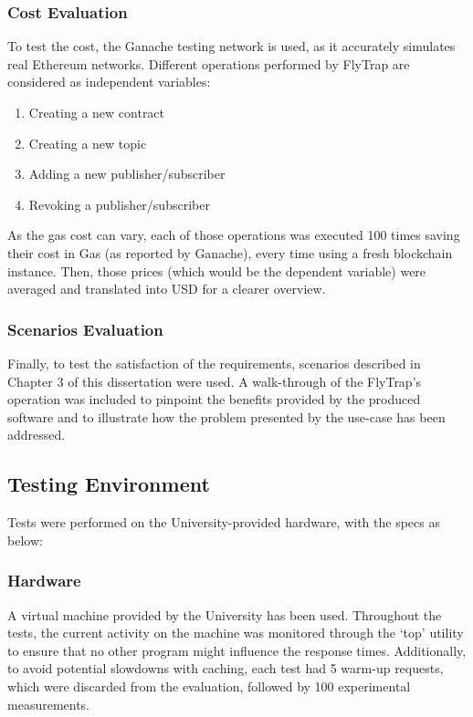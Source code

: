 \subsubsection{Cost Evaluation}
To test the cost, the Ganache testing network is used, as it accurately simulates real Ethereum networks. Different operations performed by FlyTrap are considered as independent variables:
\begin{enumerate}
  \item Creating a new contract
  \item Creating a new topic
  \item Adding a new publisher/subscriber
  \item Revoking a publisher/subscriber
\end{enumerate}
As the gas cost can vary, each of those operations was executed 100 times saving their cost in Gas (as reported by Ganache), every time using a fresh blockchain instance. Then, those prices (which would be the dependent variable) were averaged and translated into USD for a clearer overview.
\subsubsection{Scenarios Evaluation}
Finally, to test the satisfaction of the requirements, scenarios described in Chapter 3 of this dissertation were used. A walk-through of the FlyTrap's operation was included to pinpoint the benefits provided by the produced software and to illustrate how the problem presented by the use-case has been addressed.

\subsection{Testing Environment}
Tests were performed on the University-provided hardware, with the specs as below:
\subsubsection{Hardware}
A virtual machine provided by the University has been used. Throughout the tests, the current activity on the machine was monitored through the `top' utility to ensure that no other program might influence the response times. Additionally, to avoid potential slowdowns with caching, each test had 5 warm-up requests, which were discarded from the evaluation, followed by 100 experimental measurements.

